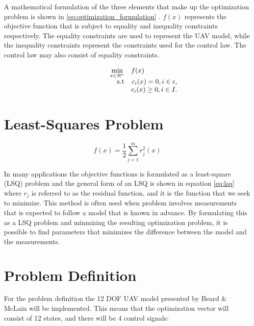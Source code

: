 A mathematical formulation of the three elements that make up the optimization problem is shown in \ref{eq:optimization_formulation} \cite{nocedalOPTIMIZATION}. $f(x)$ represents the objective function that is subject to equality and inequality constraints respectively. The equality constraints are used to represent the UAV model, while the inequality constraints represent the constraints used for the control law. The control law may also consist of equality constraints.

\begin{equation}
	\label{eq:optimization_formulation}
	\begin{array}{rrclcl}
		\displaystyle \min_{x \in R^n} & \multicolumn{3}{l}{f(x)} \\
		\textrm{s.t}
		& c_i(x) = 0, i \in \epsilon, \\
		& c_i(x) \geq 0, i \in I.
	\end{array}
\end{equation}

\section{Least-Squares Problem}

\begin{equation}
	\label{eq:lsq}
	f(x) = \frac{1}{2} \sum_{j=1}^m r_j^2(x)
\end{equation}

In many applications the objective functions is formulated as a least-square (LSQ) problem and the general form of an LSQ is shown in equation \ref{eq:lsq} \cite{nocedalOPTIMIZATION} where $r_j$ is referred to as the residual function, and it is the function that we seek to minimize. This method is often used when problem involves measurements that is expected to follow a model that is known in advance. By formulating this as a LSQ problem and minmizing the resulting optimization problem, it is possible to find parameters that minimizes the difference between the model and the measurements. 


\section{Problem Definition}

For the problem definition the 12 DOF UAV model presented by Beard \& McLain \cite{uavBEARD} will be implemented. This means that the optimization vector will consist of 12 states, and there will be 4 control signals:

